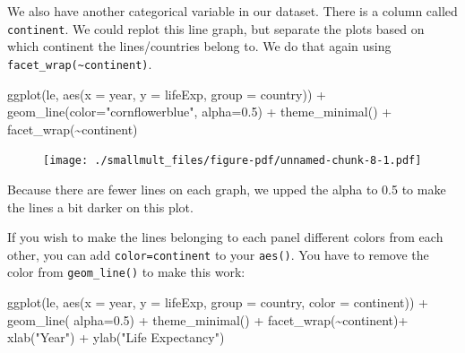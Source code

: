 \documentclass[
  letterpaper,
  DIV=11,
  numbers=noendperiod]{scrreprt}
\newenvironment{Shaded}{\begin{snugshade}}{\end{snugshade}}
\newcommand{\AttributeTok}[1]{\textcolor[rgb]{0.40,0.45,0.13}{#1}}
\newcommand{\FloatTok}[1]{\textcolor[rgb]{0.68,0.00,0.00}{#1}}
\newcommand{\FunctionTok}[1]{\textcolor[rgb]{0.28,0.35,0.67}{#1}}
\newcommand{\NormalTok}[1]{\textcolor[rgb]{0.00,0.23,0.31}{#1}}
\newcommand{\SpecialCharTok}[1]{\textcolor[rgb]{0.37,0.37,0.37}{#1}}
\newcommand{\StringTok}[1]{\textcolor[rgb]{0.13,0.47,0.30}{#1}}
\begin{document}
We also have another categorical variable in our dataset. There is a
column called \texttt{continent}. We could replot this line graph, but
separate the plots based on which continent the lines/countries belong
to. We do that again using
\texttt{facet\_wrap(\textasciitilde{}continent)}.

\begin{Shaded}
\begin{Highlighting}[]
\FunctionTok{ggplot}\NormalTok{(le, }\FunctionTok{aes}\NormalTok{(}\AttributeTok{x =}\NormalTok{ year, }\AttributeTok{y =}\NormalTok{ lifeExp, }\AttributeTok{group =}\NormalTok{ country)) }\SpecialCharTok{+} 
  \FunctionTok{geom\_line}\NormalTok{(}\AttributeTok{color=}\StringTok{"cornflowerblue"}\NormalTok{, }\AttributeTok{alpha=}\FloatTok{0.5}\NormalTok{) }\SpecialCharTok{+}
  \FunctionTok{theme\_minimal}\NormalTok{() }\SpecialCharTok{+}
  \FunctionTok{facet\_wrap}\NormalTok{(}\SpecialCharTok{\textasciitilde{}}\NormalTok{continent)}
\end{Highlighting}
\end{Shaded}

\begin{figure}[H]

{\centering \texttt{[image: ./smallmult\_files/figure-pdf/unnamed-chunk-8-1.pdf]}

}

\end{figure}

Because there are fewer lines on each graph, we upped the alpha to 0.5
to make the lines a bit darker on this plot.

If you wish to make the lines belonging to each panel different colors
from each other, you can add \texttt{color=continent} to your
\texttt{aes()}. You have to remove the color from \texttt{geom\_line()}
to make this work:

\begin{Shaded}
\begin{Highlighting}[]
\FunctionTok{ggplot}\NormalTok{(le, }\FunctionTok{aes}\NormalTok{(}\AttributeTok{x =}\NormalTok{ year, }\AttributeTok{y =}\NormalTok{ lifeExp, }\AttributeTok{group =}\NormalTok{ country, }\AttributeTok{color =}\NormalTok{ continent)) }\SpecialCharTok{+} 
  \FunctionTok{geom\_line}\NormalTok{( }\AttributeTok{alpha=}\FloatTok{0.5}\NormalTok{) }\SpecialCharTok{+}
  \FunctionTok{theme\_minimal}\NormalTok{() }\SpecialCharTok{+}
  \FunctionTok{facet\_wrap}\NormalTok{(}\SpecialCharTok{\textasciitilde{}}\NormalTok{continent)}\SpecialCharTok{+}
  \FunctionTok{xlab}\NormalTok{(}\StringTok{"Year"}\NormalTok{) }\SpecialCharTok{+}
  \FunctionTok{ylab}\NormalTok{(}\StringTok{"Life Expectancy"}\NormalTok{)}
\end{Highlighting}
\end{Shaded}
\end{document}

